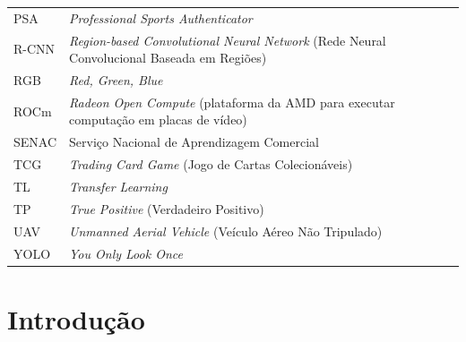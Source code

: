 \documentclass[
    12pt,                %
    openright,           %
    oneside,             %
    a4paper,             %
    english,             %
    brazil               %
]{abntex2}
\begin{document}
\begin{longtable}{@{}>{\raggedright\arraybackslash}p{3.8cm}>{\raggedright\arraybackslash}p{\dimexpr\textwidth-3.8cm-2\tabcolsep\relax}@{}}
PSA    & \textit{Professional Sports Authenticator} \\
R-CNN  & \textit{Region-based Convolutional Neural Network} (Rede Neural Convolucional Baseada em Regiões) \\
RGB    & \textit{Red, Green, Blue} \\
ROCm   & \textit{Radeon Open Compute} (plataforma da AMD para executar computação em placas de vídeo) \\
SENAC  & Serviço Nacional de Aprendizagem Comercial \\
TCG    & \textit{Trading Card Game} (Jogo de Cartas Colecionáveis) \\
TL     & \textit{Transfer Learning} \\
TP     & \textit{True Positive} (Verdadeiro Positivo) \\
UAV    & \textit{Unmanned Aerial Vehicle} (Veículo Aéreo Não Tripulado) \\
YOLO   & \textit{You Only Look Once} \\
\end{longtable}
\addtocounter{table}{-1} %

\cleardoublepage

\tableofcontents*
\cleardoublepage

\textual

\chapter{Introdução}
\label{cap:introducao}
\end{document}
